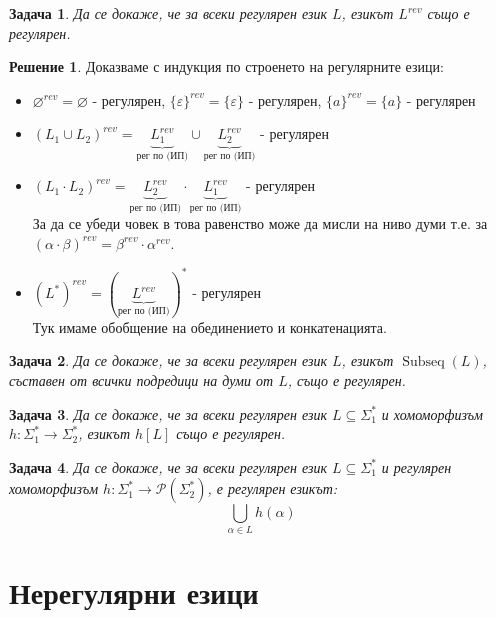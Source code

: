 \documentclass{article}
\newtheorem{problem}{Задача}[section]
\theoremstyle{definition}
\newtheorem*{solution}{Решение}
\begin{document}
\begin{problem}
Да се докаже, че за всеки регулярен език $L$, езикът $L^{rev}$ също е регулярен.
\end{problem}

\begin{solution}
    Доказваме с индукция по строенето на регулярните езици:

    \begin{itemize}
        \item $\varnothing^{rev} = \varnothing$ - регулярен, $\{ \varepsilon \}^{rev} = \{ \varepsilon \}$ - регулярен, $\{a\}^{rev} = \{ a \}$ - регулярен
        \item $(L_1 \cup L_2)^{rev} = \underbrace{L_1^{rev}}_{\text{рег по (ИП)}} \cup \underbrace{L_2^{rev}}_{\text{рег по (ИП)}}$ - регулярен
        \item $(L_1 \cdot L_2)^{rev} = \underbrace{L_2^{rev}}_{\text{рег по (ИП)}} \cdot \underbrace{L_1^{rev}}_{\text{рег по (ИП)}}$ - регулярен \\
              За да се убеди човек в това равенство може да мисли на ниво думи т.е. за $(\alpha \cdot \beta)^{rev} = \beta^{rev} \cdot \alpha^{rev}$.
        \item $(L^*)^{rev} = (\underbrace{L^{rev}}_{\text{рег по (ИП)}})^*$ - регулярен \\
              Тук имаме обобщение на обединението и конкатенацията.
    \end{itemize}
\end{solution}

\begin{problem}
Да се докаже, че за всеки регулярен език $L$, езикът $\operatorname{Subseq}(L)$, съставен от всички подредици на думи от $L$, също е регулярен.
\end{problem}

\begin{problem}
Да се докаже, че за всеки регулярен език $L \subseteq \Sigma_1^*$ и хомоморфизъм $h : \Sigma_1^* \rightarrow \Sigma_2^*$, езикът $h[L]$ също е регулярен.
\end{problem}

\begin{problem}
Да се докаже, че за всеки регулярен език $L \subseteq \Sigma_1^*$ и регулярен хомоморфизъм $h : \Sigma_1^* \rightarrow \mathcal{P}(\Sigma_2^*)$, е регулярен езикът:
\[
    \bigcup\limits_{\alpha \in L} h(\alpha)
\]
\end{problem}

\section{Нерегулярни езици}
\end{document}
